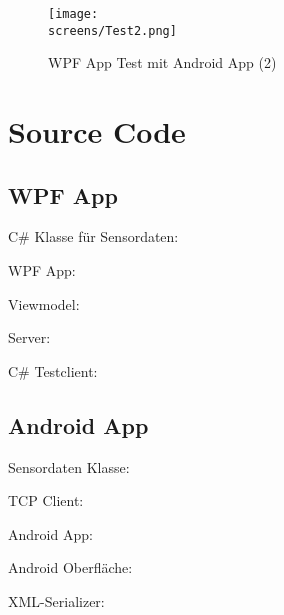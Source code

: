 \documentclass[12pt,a4paper]{article}
\begin{document}
\begin{figure}[!htb]%
\centering
\texttt{[image: \\screens/Test2.png]}%
\caption{WPF App Test mit Android App (2)}%
\label{}%
\end{figure}

\FloatBarrier
\newpage
\section{Source Code}

\subsection{WPF App}
C\# Klasse für Sensordaten:


WPF App:


Viewmodel:


Server:


C\# Testclient:


\subsection{Android App}
Sensordaten Klasse:


TCP Client:


Android App:


Android Oberfläche:


XML-Serializer:

\end{document}

